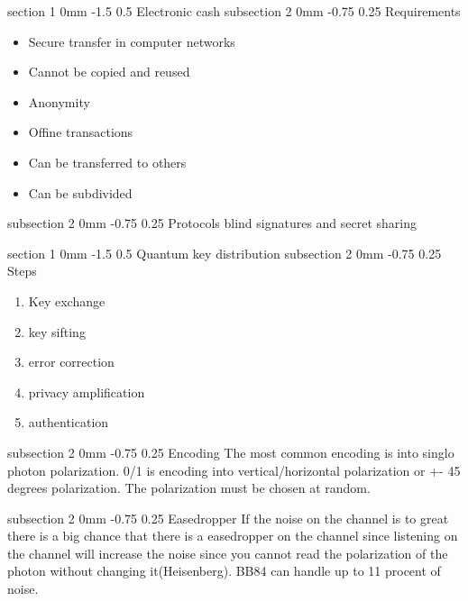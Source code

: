 \documentclass[a4paper,11pt]{article}
\makeatletter
\renewcommand{\section}{\@startsection
   {section}%
   {1}%
   {0mm}%
   {-1.5\baselineskip}%
   {0.5\baselineskip}%
   {\sffamily\bfseries\upshape\normalsize}}%
\renewcommand{\subsection}{\@startsection
   {subsection}%
   {2}%
   {0mm}%
   {-0.75\baselineskip}%
   {0.25\baselineskip}%
   {\rmfamily\normalfont\slshape\normalsize}}%
\makeatother
\begin{document}
\section{Electronic cash}
\subsection{Requirements}
\begin{itemize}
\item Secure transfer in computer networks
\item Cannot be copied and reused
\item Anonymity
\item Offine transactions
\item Can be transferred to others
\item Can be subdivided
\end{itemize}

\subsection{Protocols}
blind signatures and secret sharing

\section{Quantum key distribution}
\subsection{Steps}
\begin{enumerate}
\item Key exchange
\item key sifting
\item error correction
\item privacy amplification
\item authentication
\end{enumerate}
\subsection{Encoding}
The most common encoding is into singlo photon polarization. 0/1 is encoding into vertical/horizontal polarization or +- 45 degrees polarization. The polarization must be chosen at random.

\subsection{Easedropper}
If the noise on the channel is to great there is a big chance that there is a easedropper on the channel since listening on the channel will increase the noise since you cannot read the polarization of the photon without changing it(Heisenberg). BB84 can handle up to 11 procent of noise.
\end{document}
